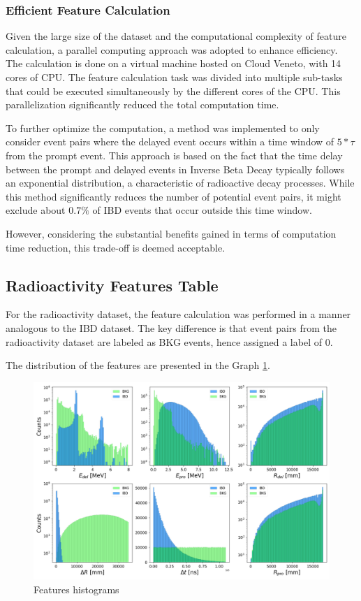 \subsubsection*{Efficient Feature Calculation}
Given the large size of the dataset and the computational complexity of feature calculation, a parallel computing approach was adopted to enhance efficiency. The calculation is done on a virtual machine hosted on Cloud Veneto, with 14 cores of CPU. The feature calculation task was divided into multiple sub-tasks that could be executed simultaneously by the different cores of the CPU. This parallelization significantly reduced the total computation time.

To further optimize the computation, a method was implemented to only consider event pairs where the delayed event occurs within a time window of $5*\tau$ from the prompt event. This approach is based on the fact that the time delay between the prompt and delayed events in Inverse Beta Decay typically follows an exponential distribution, a characteristic of radioactive decay processes. While this method significantly reduces the number of potential event pairs, it might exclude about $0.7\%$ of IBD events that occur outside this time window. 

However, considering the substantial benefits gained in terms of computation time reduction, this trade-off is deemed acceptable.

\subsection{Radioactivity Features Table}
For the radioactivity dataset, the feature calculation was performed in a manner analogous to the IBD dataset. The key difference is that event pairs from the radioactivity dataset are labeled as BKG events, hence assigned a label of 0.


The distribution of the features are presented in the Graph \ref{fig:hist_features}.
\begin{figure}[h]
	\centering
	\includegraphics[width=1\linewidth]{Images/hist_features.png}
	\caption{Features histograms}
	\label{fig:hist_features}
\end{figure}


